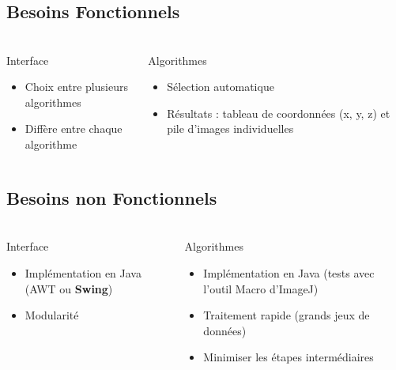 \documentclass[11pt]{beamer}
\begin{document}
\subsection{Besoins Fonctionnels}
\begin{frame}
\frametitle{\subsecname}
	\begin{columns}[t]
		
		\begin{column}{5cm}
			\begin{block}{Interface}
				\begin{itemize}
					\item Choix entre plusieurs algorithmes
					\item Diffère entre chaque algorithme
				\end{itemize}
			\end{block}
		\end{column}
		\begin{column}{5cm}
			\begin{block}{Algorithmes}
				\begin{itemize}
					\item Sélection automatique
					\item Résultats : tableau de coordonnées (x, y, z) et pile d'images individuelles
				\end{itemize}
			\end{block}
		\end{column}
	\end{columns}	
\end{frame}

\subsection{Besoins non Fonctionnels}
\begin{frame}
\frametitle{\subsecname}
	\begin{columns}[t]
		\begin{column}{5cm}
			\begin{block}{Interface}
				\begin{itemize}
					\item Implémentation en Java (AWT ou \textbf{Swing})
					\item Modularité
				\end{itemize}
			\end{block}
		\end{column}
		\begin{column}{5cm}
			\begin{block}{Algorithmes}
				\begin{itemize}
					\item Implémentation en Java (tests avec l'outil Macro d'ImageJ)
					\item Traitement rapide (grands jeux de données)
					\item Minimiser les étapes intermédiaires
				\end{itemize}
			\end{block}
		\end{column}
	\end{columns}
\end{frame}
\end{document}
